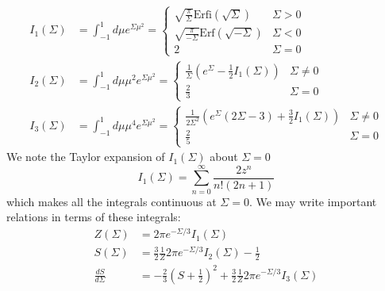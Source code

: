 \documentclass[reqno]{article}
\begin{document}
    \begin{align}
        I_1(\Sigma)
        &=
        \int_{-1}^1 d\mu e^{\Sigma \mu^2}
        =
        \begin{cases}
            \sqrt{\frac{\pi}{\Sigma}} \text{Erfi} \left(\sqrt{\Sigma}\right)
            &\Sigma > 0 \\
            \sqrt{\frac{\pi}{-\Sigma}} \text{Erf} \left(\sqrt{-\Sigma}\right)
            &\Sigma < 0 \\
            2 &\Sigma = 0
        \end{cases} \\
        I_2(\Sigma)
        &=
        \int_{-1}^1 d\mu \mu^2 e^{\Sigma \mu^2}
        =
        \begin{cases}
            \frac{1}{\Sigma} \left( e^\Sigma - \frac12 I_1(\Sigma) \right)
            &\Sigma \neq 0 \\
            \frac23 &\Sigma = 0
        \end{cases} \\
        I_3(\Sigma)
        &=
        \int_{-1}^1 d\mu \mu^4 e^{\Sigma \mu^2}
        =
        \begin{cases}
            \frac{1}{2 \Sigma^2} \left(
                e^\Sigma \left( 2\Sigma - 3 \right)
                + \frac32 I_1(\Sigma) 
            \right)
            &\Sigma \neq 0 \\
            \frac25
            &\Sigma = 0
            \end{cases}
    \end{align}
    We note the Taylor expansion of $I_1(\Sigma)$ about $\Sigma = 0$
    \begin{equation}
        I_1(\Sigma)
        =
        \sum_{n = 0}^\infty
        \frac{2 z^n}{n! \left( 2n + 1 \right)}
    \end{equation}
    which makes all the integrals continuous at $\Sigma = 0$.
    We may write important relations in terms of these integrals:
    \begin{align}
        Z(\Sigma)
        &=
        2 \pi e^{-\Sigma/3} I_1(\Sigma) \\
        S(\Sigma)
        &=
        \frac32 \frac{1}{Z} 2 \pi e^{-\Sigma/3} I_2(\Sigma) - \frac12 \\
        \frac{dS}{d\Sigma}
        &=
        -\frac23 \left(S + \frac12\right)^2
        + \frac32 \frac{1}{Z} 2 \pi e^{-\Sigma / 3} I_3(\Sigma)
    \end{align}
    
\end{document}
